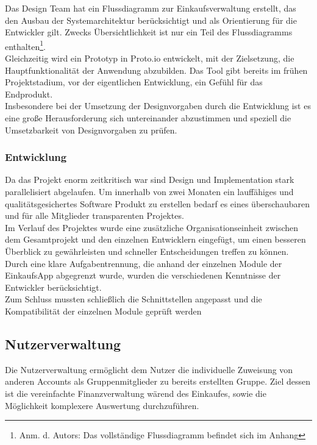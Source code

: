 \documentclass[12pt,a4paper]{article}
\begin{document}
\normalsize
Das Design Team hat ein Flussdiagramm zur Einkaufsverwaltung erstellt, das den Ausbau der Systemarchitektur berücksichtigt und als Orientierung für die Entwickler gilt. Zwecks Übersichtlichkeit ist nur ein Teil des Flussdiagramms enthalten\footnote {Anm. d. Autors: Das vollständige Flussdiagramm befindet sich im Anhang}. 
\\
Gleichzeitig wird ein Prototyp in Proto.io entwickelt, mit der Zielsetzung, die Hauptfunktionalität der Anwendung abzubilden. Das Tool gibt bereits im frühen Projektstadium, vor der eigentlichen Entwicklung, ein Gefühl für das Endprodukt.
\\
Insbesondere bei der Umsetzung der Designvorgaben durch die Entwicklung ist es eine große Herausforderung sich untereinander abzustimmen und speziell die Umsetzbarkeit von Designvorgaben zu prüfen. 

\subsubsection*{Entwicklung}
Da das Projekt enorm zeitkritisch war sind Design und Implementation stark parallelisiert abgelaufen. Um innerhalb von zwei Monaten ein lauffähiges und qualitätsgesichertes Software Produkt zu erstellen bedarf es eines überschaubaren und für alle Mitglieder transparenten Projektes.
\\
Im Verlauf des Projektes wurde eine zusätzliche Organisationseinheit zwischen dem Gesamtprojekt und den einzelnen Entwicklern eingefügt, um einen besseren Überblick zu gewährleisten und schneller Entscheidungen treffen zu können. 
\\
Durch eine klare Aufgabentrennung, die anhand der einzelnen Module der EinkaufsApp abgegrenzt wurde, wurden die verschiedenen Kenntnisse der Entwickler berücksichtigt. 
\\
Zum Schluss mussten schließlich die Schnittstellen angepasst und die Kompatibilität der einzelnen Module geprüft werden

\subsection{Nutzerverwaltung}
Die Nutzerverwaltung ermöglicht dem Nutzer die individuelle Zuweisung von anderen Accounts als Gruppenmitglieder zu bereits erstellten Gruppe. Ziel dessen ist die vereinfachte Finanzverwaltung wärend des Einkaufes, sowie die Möglichkeit komplexere Auswertung durchzuführen.
\end{document}
